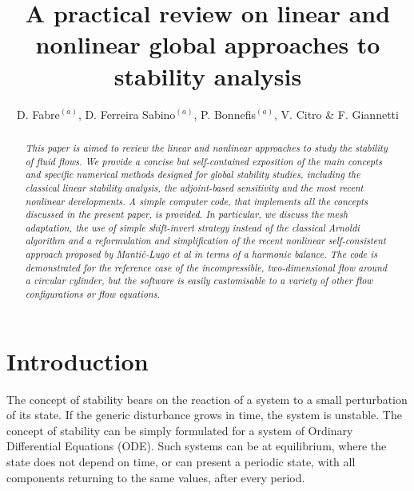 \documentclass[twocolumn,10pt]{asme2ej}
\title{A {practical} review on linear and nonlinear global approaches to stability analysis}
\author{D. Fabre$^{(a)}$, D. Ferreira Sabino$^{(a)}$, P. Bonnefis$^{(a)}$,  V. Citro \& F. Giannetti
    \affiliation{
	IMFT, University of Toulouse
    }	
}
\begin{document}
\lstset{numbers=left, numberstyle=\small, numbersep=8pt, frame = single, language=Matlab, framexleftmargin=15pt}

\maketitle    

\begin{abstract}
{\it 
This paper is aimed to review the linear and nonlinear approaches to study the stability of fluid flows. 
We provide a concise but self-contained exposition of the main concepts and specific numerical methods 
designed for global stability studies, including the classical linear stability analysis, the adjoint-based sensitivity and  
the most recent nonlinear developments.
A simple computer code, that implements all the concepts discussed in the present paper, is provided. 
In particular, we discuss the mesh adaptation, the use of simple shift-invert strategy instead of the classical Arnoldi algorithm and a reformulation and simplification of the recent nonlinear self-consistent approach proposed by Manti\v{c}-Lugo et al \cite{MLugo2014} in terms of a harmonic balance. The code is demonstrated for the reference case of the incompressible, two-dimensional flow around a circular cylinder, but the software is easily customisable to a variety of other 
flow configurations or flow equations.
}
\end{abstract}



\section{Introduction}

The concept of stability bears on the reaction of a system to a small perturbation of its state. If the generic disturbance grows in time, the system is unstable. The concept of stability can be simply formulated for a system of Ordinary Differential Equations (ODE). 
Such systems can be at equilibrium, where the state does not depend on time, or can present a periodic state, with all components returning to the same values, after every period. 
\end{document}
